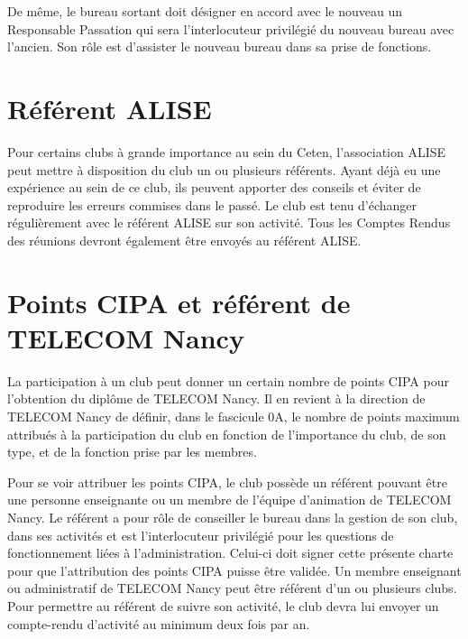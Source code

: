 \documentclass{article}
\begin{document}
\begin{multicols}{2}
{			De même, le bureau sortant doit désigner en accord avec le
			nouveau un Responsable Passation qui sera l’interlocuteur
			privilégié du nouveau bureau avec l’ancien. Son rôle est
			d’assister le nouveau bureau dans sa prise de fonctions.

		}
		
		\section{Référent ALISE}

		{\small

			Pour certains clubs à grande importance au sein du Ceten,
			l’association ALISE peut mettre à disposition du club un ou
			plusieurs référents. Ayant déjà eu une expérience au sein de
			ce club, ils peuvent apporter des conseils et éviter de
			reproduire les erreurs commises dans le passé. Le club est
			tenu d’échanger régulièrement avec le référent ALISE sur
			son activité. Tous les Comptes Rendus des réunions devront
			également être envoyés au référent ALISE\@.

		}
		
		\section{Points CIPA et référent de TELECOM Nancy}

		{\small

			La participation à un club peut donner un certain nombre de
			points CIPA pour l’obtention du diplôme de TELECOM
			Nancy. Il en revient à la direction de TELECOM Nancy de
			définir, dans le fascicule 0A, le nombre de points maximum
			attribués à la participation du club en fonction de
			l’importance du club, de son type, et de la fonction prise par
			les membres.

			Pour se voir attribuer les points CIPA, le club possède un
			référent pouvant être une personne enseignante ou un
			membre de l’équipe d’animation de TELECOM Nancy. Le
			référent a pour rôle de conseiller le bureau dans la gestion
			de son club, dans ses activités et est l’interlocuteur privilégié
			pour les questions de fonctionnement liées à
			l’administration. Celui-ci doit signer cette présente charte
			pour que l’attribution des points CIPA puisse être validée.
			Un membre enseignant ou administratif de TELECOM Nancy
			peut être référent d’un ou plusieurs clubs. Pour permettre
			au référent de suivre son activité, le club devra lui envoyer
			un compte-rendu d’activité au minimum deux fois par an.

}
\end{multicols}
\end{document}
